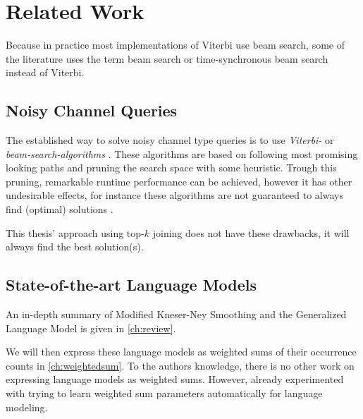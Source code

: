 \chapter{Related Work}
\label{ch:relatedwork}

\begin{draft}
\begin{displayquote}
Because in practice most implementations of Viterbi use beam
search, some of the literature uses the term beam search or time-synchronous beam
search instead of Viterbi.
\end{displayquote}
\end{draft}

\section{Noisy Channel Queries}

The established way to solve noisy channel type queries is to use
\emph{Viterbi-} or \emph{beam-search-algorithms}
\parencite{JurafskyMartin2009,Bickel2005}.
These algorithms are based on following most promising looking paths and
pruning the search space with some heuristic.
Trough this pruning, remarkable runtime performance can be achieved, however it
has other undesirable effects, for instance these algorithms are not guaranteed
to always find (optimal) solutions \parencite{Bickel2005}.

This thesis' approach using top-$k$ joining does not have these drawbacks, it
will always find the best solution(s).

\section{State-of-the-art Language Models}



An in-depth summary of Modified Kneser-Ney Smoothing and the Generalized
Language Model is given in \cref{ch:review}.

We will then express these language models as weighted sums of their occurrence
counts in \cref{ch:weightedsum}.
To the authors knowledge, there is no other work on expressing language models
as weighted sums.
However, \textcite{JelinekMercer1980} already experimented with trying to learn
weighted sum parameters automatically for language modeling.


